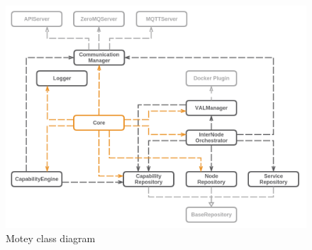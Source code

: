 \begin{figure}[H]
    \centering
    \includegraphics[width=\textwidth]{resources/images/class_diagram.png}
    \caption[Motey class diagram]{Motey class diagram}
    \label{fig:motey_class_diagram}
\end{figure}

